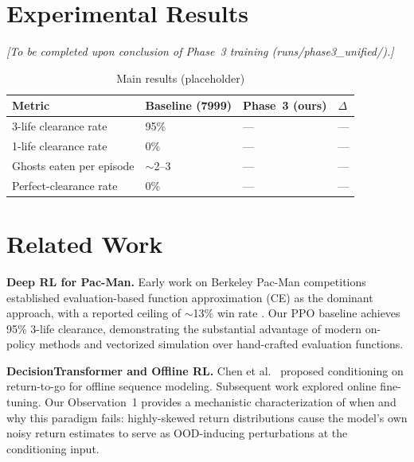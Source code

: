 \documentclass[11pt,a4paper]{article}
\theoremstyle{definition}
\begin{document}
\section{Experimental Results}

\textit{[To be completed upon conclusion of Phase~3 training (runs/phase3\_unified/).]}

\begin{table}[ht]
\centering
\small
\caption{Main results (placeholder)}
\label{tab:main-results}
\begin{tabular}{@{}p{4cm}p{3cm}p{3cm}p{2cm}@{}}
\toprule
\textbf{Metric} & \textbf{Baseline (7999)} & \textbf{Phase~3 (ours)} & \textbf{$\Delta$} \\
\midrule
3-life clearance rate & 95\% & --- & --- \\
1-life clearance rate & 0\% & --- & --- \\
Ghosts eaten per episode & $\sim$2--3 & --- & --- \\
Perfect-clearance rate & 0\% & --- & --- \\
\bottomrule
\end{tabular}
\end{table}

\section{Related Work}

\textbf{Deep RL for Pac-Man.}
Early work on Berkeley Pac-Man competitions established evaluation-based function approximation (CE) as the dominant approach, with a reported ceiling of $\sim$13\% win rate \cite{berkeley}.
Our PPO baseline achieves 95\% 3-life clearance, demonstrating the substantial advantage of modern on-policy methods and vectorized simulation over hand-crafted evaluation functions.

\textbf{DecisionTransformer and Offline RL.}
Chen et al.\ \cite{dt} proposed conditioning on return-to-go for offline sequence modeling.
Subsequent work \cite{dt_online} explored online fine-tuning.
Our Observation~1 provides a mechanistic characterization of when and why this paradigm fails: highly-skewed return distributions cause the model's own noisy return estimates to serve as OOD-inducing perturbations at the conditioning input.
\end{document}
